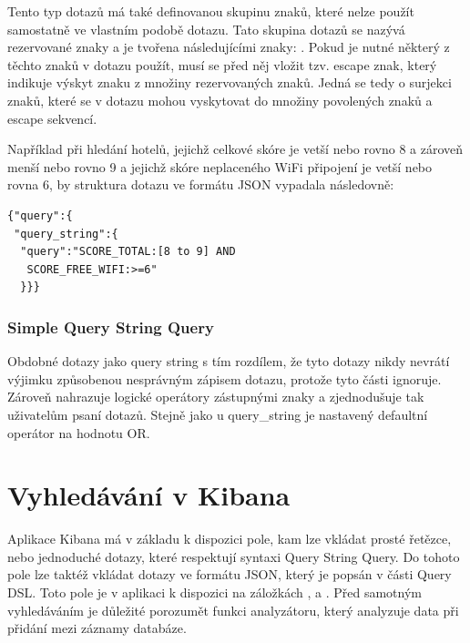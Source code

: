 \documentclass[czech,BP]{thesiskiv}
\begin{document}
Tento typ dotazů má také definovanou skupinu znaků, které nelze použít samostatně ve vlastním podobě dotazu. Tato skupina dotazů se nazývá rezervované znaky a je tvořena následujícími znaky: . Pokud je nutné některý z těchto znaků v dotazu použít, musí se před něj vložit tzv. escape znak, který indikuje výskyt znaku z množiny rezervovaných znaků. Jedná se tedy o surjekci znaků, které se v dotazu mohou vyskytovat do množiny povolených znaků a escape sekvencí.


Například při hledání hotelů, jejichž celkové skóre je vetší nebo rovno 8 a zároveň menší nebo rovno 9 a jejichž skóre neplaceného WiFi připojení je vetší nebo rovna 6, by struktura dotazu ve formátu JSON vypadala následovně:

\begin{lstlisting}[xleftmargin=0.2\textwidth]
{"query":{
 "query_string":{
  "query":"SCORE_TOTAL:[8 to 9] AND 
   SCORE_FREE_WIFI:>=6"
  }}}
\end{lstlisting}

	
\subsubsection{Simple Query String Query}
Obdobné dotazy jako query string s tím rozdílem, že tyto dotazy nikdy nevrátí výjimku způsobenou nesprávným zápisem dotazu, protože tyto části ignoruje. Zároveň nahrazuje logické operátory zástupnými znaky a zjednodušuje tak uživatelům psaní dotazů.  Stejně jako u query\_string je nastavený defaultní operátor na hodnotu OR.

\section{Vyhledávání v Kibana}
Aplikace Kibana má v základu k dispozici pole, kam lze vkládat prosté řetězce, nebo  jednoduché dotazy, které respektují syntaxi Query String Query. Do tohoto pole lze taktéž vkládat dotazy ve formátu JSON, který je popsán v části Query DSL. Toto pole je v aplikaci k dispozici na záložkách ,  a . Před samotným vyhledáváním je důležité porozumět funkci analyzátoru, který analyzuje data při přidání mezi záznamy databáze.
\end{document}
